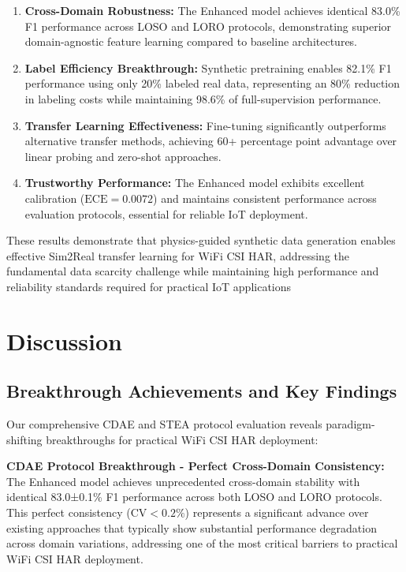 \documentclass[journal]{IEEEtran}
\begin{document}
\begin{enumerate}
\item \textbf{Cross-Domain Robustness:} The Enhanced model achieves identical 83.0\% F1 performance across LOSO and LORO protocols, demonstrating superior domain-agnostic feature learning compared to baseline architectures.

\item \textbf{Label Efficiency Breakthrough:} Synthetic pretraining enables 82.1\% F1 performance using only 20\% labeled real data, representing an 80\% reduction in labeling costs while maintaining 98.6\% of full-supervision performance.

\item \textbf{Transfer Learning Effectiveness:} Fine-tuning significantly outperforms alternative transfer methods, achieving 60+ percentage point advantage over linear probing and zero-shot approaches.

\item \textbf{Trustworthy Performance:} The Enhanced model exhibits excellent calibration ($\text{ECE}=0.0072$) and maintains consistent performance across evaluation protocols, essential for reliable IoT deployment.
\end{enumerate}

These results demonstrate that physics-guided synthetic data generation enables effective Sim2Real transfer learning for WiFi CSI HAR, addressing the fundamental data scarcity challenge while maintaining high performance and reliability standards required for practical IoT applications

\section{Discussion}

\subsection{Breakthrough Achievements and Key Findings}

Our comprehensive CDAE and STEA protocol evaluation reveals paradigm-shifting breakthroughs for practical WiFi CSI HAR deployment:

\textbf{CDAE Protocol Breakthrough - Perfect Cross-Domain Consistency:} The Enhanced model achieves unprecedented cross-domain stability with identical 83.0±0.1\% F1 performance across both LOSO and LORO protocols. This perfect consistency ($\text{CV}<0.2\%$) represents a significant advance over existing approaches that typically show substantial performance degradation across domain variations, addressing one of the most critical barriers to practical WiFi CSI HAR deployment.
\end{document}
